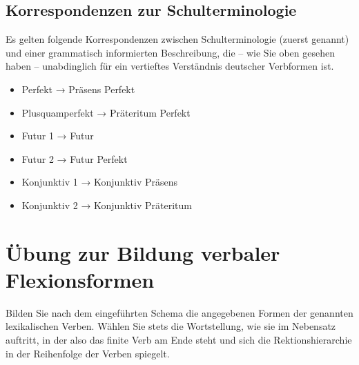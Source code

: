 \subsection{Korrespondenzen zur Schulterminologie}

Es gelten folgende Korrespondenzen zwischen Schulterminologie (zuerst genannt) und einer grammatisch informierten Beschreibung, die -- wie Sie oben gesehen haben -- unabdinglich für ein vertieftes Verständnis deutscher Verbformen ist.

\begin{itemize}\Lf
  \item Perfekt → Präsens Perfekt
  \item Plusquamperfekt → Präteritum Perfekt
  \item Futur 1 → Futur
  \item Futur 2 → Futur Perfekt
  \item Konjunktiv 1 → Konjunktiv Präsens
  \item Konjunktiv 2 → Konjunktiv Präteritum
\end{itemize}

\newpage

\section{Übung zur Bildung verbaler Flexionsformen}

Bilden Sie nach dem eingeführten Schema die angegebenen Formen der genannten lexikalischen Verben.
Wählen Sie stets die Wortstellung, wie sie im Nebensatz auftritt, in der also das finite Verb am Ende steht und sich die Rektionshierarchie in der Reihenfolge der Verben spiegelt.

\enlargethispage{5\baselineskip}

